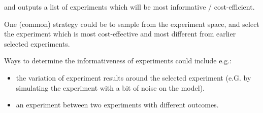 \documentclass{article}
\begin{document}
and outputs a list of experiments which will be most informative / cost-efficient.

One (common) strategy could be to sample from the experiment space, and select the experiment which is most cost-effective and most different from earlier selected experiments.

Ways to determine the informativeness of experiments could include e.g.:
\begin{itemize}
\item the variation of experiment results around the selected experiment (e.G. by simulating the experiment with a bit of noise on the model).
\item an experiment between two experiments with different outcomes.
\end{itemize}
\end{document}

